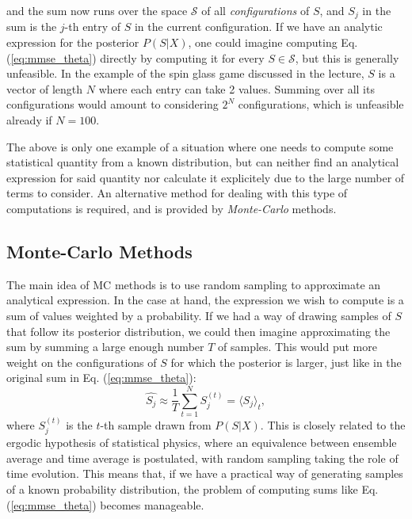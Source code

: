 \documentclass{article}
\begin{document}
and the sum now runs over the space $\mathcal{S}$ of all \emph{configurations} of $S$, and $S_j$ in the sum is the $j$-th entry of $S$ in the current configuration. If we have an analytic expression for the posterior $P(S|X)$, one could imagine computing Eq. (\ref{eq:mmse_theta}) directly by computing it for every $S\in\mathcal{S}$, but this is generally unfeasible. In the example of the spin glass game discussed in the lecture, $S$ is a vector of length $N$ where each entry can take 2 values. Summing over all its configurations would amount to considering $2^N$ configurations, which is unfeasible already if $N=100$.

The above is only one example of a situation where one needs to compute some statistical quantity from a known distribution, but can neither find an analytical expression for said quantity nor calculate it explicitely due to the large number of terms to consider. An alternative method for dealing with this type of computations is required, and is provided by \emph{Monte-Carlo} methods.

\subsection{Monte-Carlo Methods}
The main idea of MC methods is to use random sampling to approximate an analytical expression. In the case at hand, the expression we wish to compute is a sum of values weighted by a probability. If we had a way of drawing samples of $S$ that follow its posterior distribution, we could then imagine approximating the sum by summing a large enough number $T$ of samples. This would put more weight on the configurations of $S$ for which the posterior is larger, just like in the original sum in Eq. (\ref{eq:mmse_theta}):
\begin{equation}
    \hat{S_j}
    \approx
    \frac{1}{T}
    \sum_{t=1}^{N} S_j^{(t)}
    =
    \langle S_j \rangle_t,
\end{equation}
where $S_j^{(t)}$ is the $t$-th sample drawn from $P(S | X)$. This is closely related to the ergodic hypothesis of statistical physics, where an equivalence between ensemble average and time average is postulated, with random sampling taking the role of time evolution. This means that, if we have a practical way of generating samples of a known probability distribution, the problem of computing sums like Eq. (\ref{eq:mmse_theta}) becomes manageable. 
\end{document}
